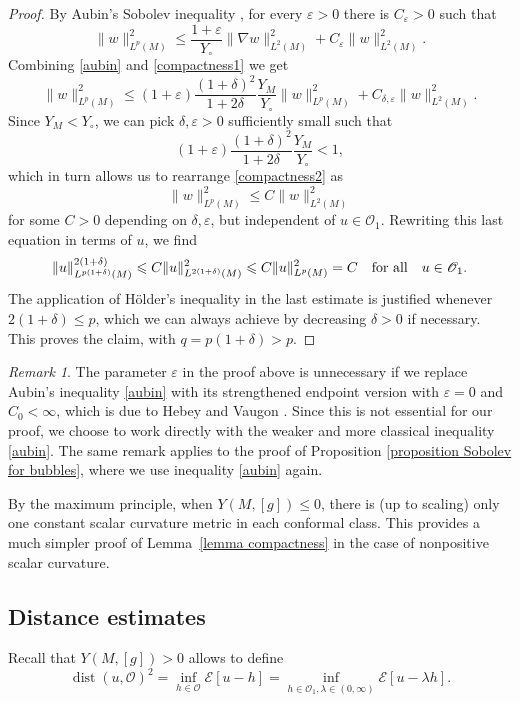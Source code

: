 \documentclass[reqno,11pt]{amsart}
\numberwithin{equation}{section}
\theoremstyle{definition}
\theoremstyle{remark}
\newtheorem{remark}[theorem]{Remark}
\DeclareMathOperator{\dist}{dist}
\newcommand{\eps}{\varepsilon}
\begin{document}
\begin{proof}
By Aubin's Sobolev inequality \cite[Theorem 2.3]{LP}, for every $\eps > 0$ there is $C_\eps > 0$ such that 
\begin{equation}
    \label{aubin}
     \|w\|_{L^p(M)}^2 \leqslant \frac{1 + \eps}{Y_\circ} \|\nabla w\|_{L^2(M)}^2 + C_\eps \|w\|_{L^2(M)}^2 .
\end{equation}
Combining \eqref{aubin} and \eqref{compactness1} we get 
\begin{equation} \label{compactness2} 
\|w\|_{L^p(M)}^2 \leqslant  (1 + \eps) \frac{(1+\delta)^2}{1 + 2 \delta} 
\frac{Y_M}{Y_\circ} \|w\|_{L^p(M)}^2 + C_{\delta, \eps} \|w\|_{L^2(M)}^2.   
\end{equation}
Since $Y_M < Y_\circ$, we can pick $\delta, \eps > 0$ sufficiently small 
such that 
\[(1 + \eps) \frac{(1+\delta)^2}{1 + 2 \delta} \frac{Y_M}{Y_\circ}< 1,\] 
which in turn allows us to rearrange \eqref{compactness2} as 
\[ \|w\|_{L^p(M)}^2 \leqslant C \|w\|_{L^2(M)}^2 \]
for some $C > 0$ depending on $\delta, \eps$, but independent of $u \in \mathscr O_1$. 
Rewriting this last equation in terms of $u$, we find 
\[ \|u\|_{L^{p(1 + \delta)}(M)}^{2(1 + \delta)} 
\leqslant C \|u\|_{L^{2(1 + \delta)}(M)}^2 \leqslant C 
\|u\|_{L^p(M)}^2 = C \quad {\rm for \ all} \quad u \in \mathscr O_1. \]
The application of H\"older's inequality in the last estimate is justified 
whenever $2(1+ \delta) \leqslant p$, which we can always achieve by decreasing 
$\delta > 0$ if necessary. This proves the claim, with $q = p(1 +\delta) > p$.
\end{proof}

\begin{remark}
    The parameter $\eps$ in the proof above is unnecessary if we replace Aubin's inequality \eqref{aubin}
    with its strengthened endpoint version with $\eps = 0$ and $C_0 < \infty$, which is due to Hebey and 
    Vaugon \cite{HeVa}. Since this is not essential for our proof, we choose to work directly with 
    the weaker and more classical inequality \eqref{aubin}. The same remark applies to the 
    proof of Proposition \ref{proposition Sobolev for bubbles}, where we use inequality \eqref{aubin} again. 
\end{remark}

By the maximum principle, when $Y(M,[g]) \leqslant 0$, there is (up to scaling) only one 
constant scalar curvature metric in each conformal class. This provides a much simpler 
proof of Lemma~\ref{lemma compactness} in the case of nonpositive 
scalar curvature. 

\subsection{Distance estimates} 
Recall that $Y(M, [g])> 0$ allows to define 
\[\dist(u, \mathscr{O})^2 = \inf_{h \in \mathscr O} \mathcal E[u - h] 
= \inf_{h \in \mathcal O_1, \lambda \in (0, \infty)} \mathcal E[u - \lambda h]. \] 
\end{document}
